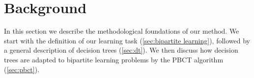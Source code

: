 \documentclass[sn-mathphys-num]{sn-jnl}%
\theoremstyle{thmstyleone}%
\theoremstyle{thmstyletwo}%
\theoremstyle{thmstylethree}%
\begin{document}




\section{Background}
\label{sec:background}

In this section we describe the methodological foundations of our method. We start with the definition of our learning task (\autoref{sec:bipartite learning}), followed by a general description of decision trees (\autoref{sec:dt}).
We then discuss how decision trees are adapted to bipartite learning problems by the PBCT algorithm (\autoref{sec:pbct}).
\end{document}

